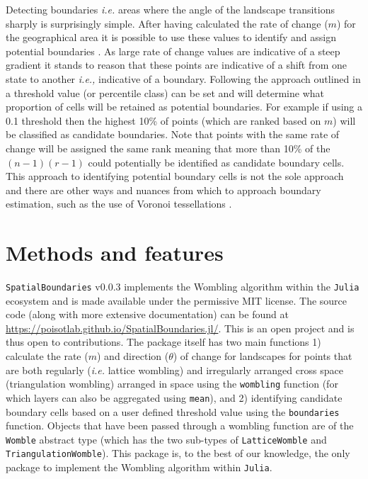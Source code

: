 Detecting boundaries \emph{i.e.} areas where the angle of the landscape
transitions sharply is surprisingly simple. After having calculated the
rate of change (\(m\)) for the geographical area it is possible to use
these values to identify and assign potential boundaries
\cite{Fortin2005SpaAna, Oden1993CatWom, Fortin1995DelEco}. As large
rate of change values are indicative of a steep gradient it stands to
reason that these points are indicative of a shift from one state to
another \emph{i.e.,} indicative of a boundary. Following the approach
outlined in \cite{Fortin2005SpaAna} a threshold value (or percentile class)
can be set and will determine what proportion of cells will be retained
as potential boundaries. For example if using a 0.1 threshold then the
highest 10\% of points (which are ranked based on \(m\)) will be
classified as candidate boundaries. Note that points with the same rate
of change will be assigned the same rank meaning that more than 10\% of
the \((n -1)(r - 1)\) could potentially be identified as candidate
boundary cells. This approach to identifying potential boundary cells is
not the sole approach and there are other ways and nuances from which to
approach boundary estimation, such as the use of Voronoi tessellations
\cite{Fortin1995DelEco, Oden1993CatWom, Matchev2020FinWom}.

\section{Methods and features}\label{methods-and-features}

\texttt{SpatialBoundaries} v0.0.3 implements the Wombling algorithm
within the \texttt{Julia} ecosystem and is made available under the
permissive MIT license. The source code (along with more extensive
documentation) can be found at
\url{https://poisotlab.github.io/SpatialBoundaries.jl/}. This is an open
project and is thus open to contributions. The package itself has two
main functions 1) calculate the rate (\(m\)) and direction (\(\theta\))
of change for landscapes for points that are both regularly (\emph{i.e.}
lattice wombling) and irregularly arranged cross space (triangulation
wombling) arranged in space using the \texttt{wombling} function (for
which layers can also be aggregated using \texttt{mean}), and 2)
identifying candidate boundary cells based on a user defined threshold
value using the \texttt{boundaries} function. Objects that have been
passed through a wombling function are of the \texttt{Womble} abstract
type (which has the two sub-types of \texttt{LatticeWomble} and
\texttt{TriangulationWomble}). This package is, to the best of our
knowledge, the only package to implement the Wombling algorithm within
\texttt{Julia}.

